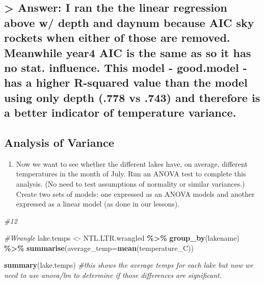 \documentclass[
]{article}
\newenvironment{Shaded}{\begin{snugshade}}{\end{snugshade}}
\newcommand{\AttributeTok}[1]{\textcolor[rgb]{0.13,0.29,0.53}{#1}}
\newcommand{\CommentTok}[1]{\textcolor[rgb]{0.56,0.35,0.01}{\textit{#1}}}
\newcommand{\FunctionTok}[1]{\textcolor[rgb]{0.13,0.29,0.53}{\textbf{#1}}}
\newcommand{\NormalTok}[1]{#1}
\newcommand{\OtherTok}[1]{\textcolor[rgb]{0.56,0.35,0.01}{#1}}
\newcommand{\SpecialCharTok}[1]{\textcolor[rgb]{0.81,0.36,0.00}{\textbf{#1}}}
\providecommand{\tightlist}{%
  \setlength{\itemsep}{0pt}\setlength{\parskip}{0pt}}
\begin{document}
\subsection{\texorpdfstring{\textgreater{} Answer: I ran the the linear
regression above w/ depth and daynum because AIC sky rockets when either
of those are removed. Meanwhile year4 AIC is the same as so it has no
stat. influence. This model - good.model - has a higher R-squared value
than the model using only depth (.778 vs .743) and therefore is a better
indicator of temperature
variance.}{\textgreater{} Answer: I ran the the linear regression above w/ depth and daynum because AIC sky rockets when either of those are removed. Meanwhile year4 AIC is the same as  so it has no stat. influence. This model - good.model - has a higher R-squared value than the model using only depth (.778 vs .743) and therefore is a better indicator of temperature variance.}}\label{answer-i-ran-the-the-linear-regression-above-w-depth-and-daynum-because-aic-sky-rockets-when-either-of-those-are-removed.-meanwhile-year4-aic-is-the-same-as-so-it-has-no-stat.-influence.-this-model---good.model---has-a-higher-r-squared-value-than-the-model-using-only-depth-.778-vs-.743-and-therefore-is-a-better-indicator-of-temperature-variance.}

\subsection{Analysis of Variance}\label{analysis-of-variance}

\begin{enumerate}
\def\labelenumi{\arabic{enumi}.}
\setcounter{enumi}{11}
\tightlist
\item
  Now we want to see whether the different lakes have, on average,
  different temperatures in the month of July. Run an ANOVA test to
  complete this analysis. (No need to test assumptions of normality or
  similar variances.) Create two sets of models: one expressed as an
  ANOVA models and another expressed as a linear model (as done in our
  lessons).
\end{enumerate}

\begin{Shaded}
\begin{Highlighting}[]
\CommentTok{\#12}

\CommentTok{\#Wrangle}
\NormalTok{lake.temps }\OtherTok{\textless{}{-}}\NormalTok{ NTL.LTR.wrangled }\SpecialCharTok{\%\textgreater{}\%} 
  \FunctionTok{group\_by}\NormalTok{(lakename) }\SpecialCharTok{\%\textgreater{}\%} 
  \FunctionTok{summarise}\NormalTok{(}\AttributeTok{average\_temp=}\FunctionTok{mean}\NormalTok{(temperature\_C))}

\FunctionTok{summary}\NormalTok{(lake.temps) }\CommentTok{\#this shows the average temps for each lake but now we need to use anova/lm to determine if those differences are significant. }
\end{Highlighting}
\end{Shaded}
\end{document}

